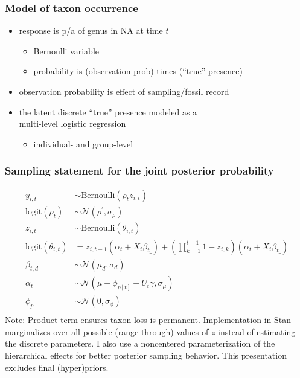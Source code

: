 \documentclass{beamer}
\begin{document}
\begin{frame}
  \frametitle{Model of taxon occurrence}
  \begin{itemize}
    \item response is p/a of genus in NA at time \(t\)
      \begin{itemize}
        \item Bernoulli variable 
        \item probability is (observation prob) times (``true'' presence)
      \end{itemize}
    \item observation probability is effect of sampling/fossil record
    \item the latent discrete ``true'' presence modeled as a \\multi-level logistic regression
      \begin{itemize}
        \item individual- and group-level
      \end{itemize}
  \end{itemize}
\end{frame}

\begin{frame}
  \frametitle{Sampling statement for the joint posterior probability}
  \footnotesize{
    \begin{align*}
      y_{i,t} &\sim \text{Bernoulli}(\rho_{t} z_{i,t}) \\
      \text{logit}(\rho_{t}) &\sim \mathcal{N}(\rho^{'}, \sigma_{\rho}) \\
      z_{i,t} &\sim \text{Bernoulli}(\theta_{i, t}) \\
      \text{logit}(\theta_{i, t}) &= z_{i,t-1} (\alpha_{t} + X_{i} \beta_{t\_}) + (\prod_{k = 1}^{t-1} 1 - z_{i,k}) (\alpha_{t} + X_{i} \beta_{t\_}) \\
      \beta_{t,d} &\sim \mathcal{N}(\mu_{d}, \sigma_{d}) \\
      \alpha_{t} &\sim \mathcal{N}(\mu + \phi_{p[t]} + U_{t} \gamma, \sigma_{\mu}) \\
      \phi_{p} &\sim \mathcal{N}(0, \sigma_{\phi}) \\
    \end{align*}
  }
  \scriptsize{Note: Product term ensures taxon-loss is permanent. Implementation in Stan marginalizes over all possible (range-through) values of \(z\) instead of estimating the discrete parameters. I also use a noncentered parameterization of the hierarchical effects for better posterior sampling behavior. This presentation excludes final (hyper)priors.}
\end{frame}
\end{document}
